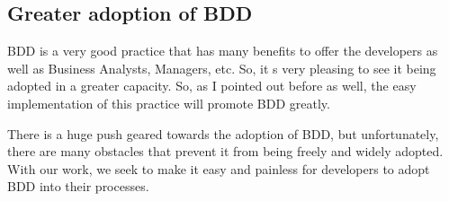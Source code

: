 \documentclass[conference, onecolumn, a4, 12pt]{IEEEtran}
\begin{document}
\subsection{Greater adoption of BDD}
BDD is a very good practice that has many benefits to offer the developers as well as Business Analysts, Managers, etc. So, it s very pleasing to see it being adopted in a greater capacity. So, as I pointed out before as well, the easy implementation of this practice will promote BDD greatly.

There is a huge push geared towards the adoption of BDD, but unfortunately, there are many obstacles that prevent it from being freely and widely adopted. With our work, we seek to make it easy and painless for developers to adopt BDD into their processes.\newline
\end{document}
